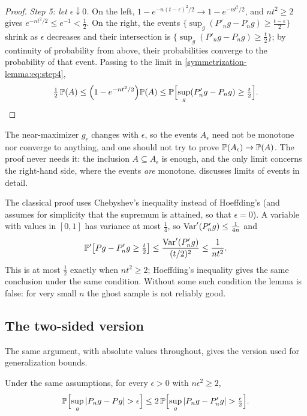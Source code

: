 \begin{notechapter}
\begin{proof}
\emph{Step 5: let $\epsilon\downarrow 0$.} On the left,
$1 - e^{-n(t-\epsilon)^2/2} \to 1 - e^{-nt^2/2}$, and $nt^2\geq2$ gives
$e^{-nt^2/2}\leq e^{-1} < \frac12$. On the right, the events
$\{\sup_g(P'_ng - P_ng) \geq \frac{t-\epsilon}{2}\}$ shrink as $\epsilon$
decreases and their intersection is $\{\sup_g(P'_ng - P_ng) \geq \frac t2\}$;
by continuity of probability from above, their probabilities converge to the
probability of that event. Passing to the limit in
\eqref{symmetrization-lemma:eq:step4},
\[
  \tfrac12\,\mathbb{P}(A) \leq \Bigl(1 - e^{-nt^2/2}\Bigr)\mathbb{P}(A)
  \leq \mathbb{P}\Bigl[\sup_g (P'_n g - P_n g) \geq \tfrac t2\Bigr]. \qedhere
\]
\end{proof}

\begin{pitfall}
The near-maximizer $g_\epsilon$ changes with $\epsilon$, so the events
$A_\epsilon$ need not be monotone nor converge to anything, and one should not
try to prove $\mathbb{P}(A_\epsilon)\to\mathbb{P}(A)$. The proof never needs it: the
inclusion $A\subseteq A_\epsilon$ is enough, and the only limit concerns the
right-hand side, where the events \emph{are} monotone.
 discusses limits of events in detail.
\end{pitfall}

\begin{remark}
The classical proof uses Chebyshev's inequality instead of Hoeffding's (and
assumes for simplicity that the supremum is attained, so that $\epsilon=0$).
A variable with values in $[0,1]$ has variance at most $\frac14$, so
$\operatorname{Var}'(P'_n g) \leq \frac1{4n}$ and
\[
  \mathbb{P}'\bigl[Pg - P'_ng \geq \tfrac t2\bigr] \leq \frac{\operatorname{Var}'(P'_n g)}{(t/2)^2} \leq \frac{1}{nt^2}.
\]
This is at most $\frac12$ exactly when $nt^2\geq2$; Hoeffding's inequality gives
the same conclusion under the same condition. Without some such condition the
lemma is false: for very small $n$ the ghost sample is not reliably good.
\end{remark}

\subsection{The two-sided version}

The same argument, with absolute values throughout, gives the version used for
generalization bounds.

\begin{corollary}\label{symmetrization-lemma:cor:two-sided}
Under the same assumptions, for every $\epsilon>0$ with $n\epsilon^2\geq2$,
\[
  \mathbb{P}\Bigl[\sup_{g}\left|P_n g - Pg\right| > \epsilon\Bigr]
  \leq 2\,\mathbb{P}\Bigl[\sup_{g}\left|P_n g - P'_n g\right| > \tfrac\epsilon2\Bigr].
\]
\end{corollary}


\end{notechapter}
